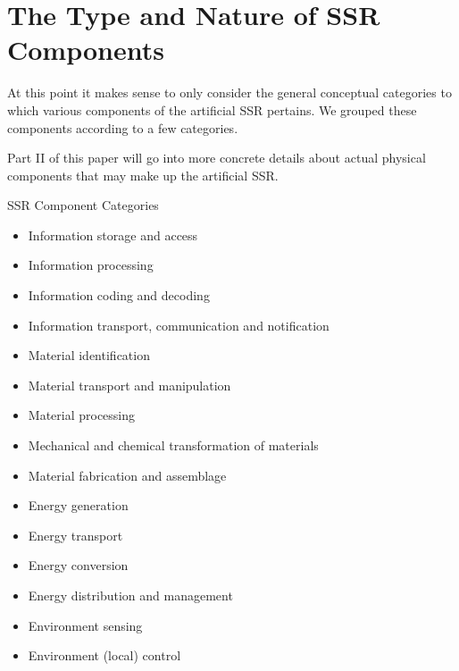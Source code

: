 \section{The Type and Nature of SSR Components}

At this point it makes sense to only consider the general conceptual
categories to which various components of the artificial SSR pertains.
We grouped these components according to a few categories.

Part II of this paper will go into more concrete details about actual
physical components that may make up the artificial SSR.

SSR Component Categories %

\begin{itemize}
\item Information storage and access
\item Information processing
\item Information coding and decoding
\item Information transport, communication and notification
\end{itemize}

\bigskip

\begin{itemize}
\item Material identification
\item Material transport and manipulation
\item Material processing
\item Mechanical and chemical transformation of materials
\item Material fabrication and assemblage
\end{itemize}

\bigskip

\begin{itemize}
\item Energy generation
\item Energy transport
\item Energy conversion
\item Energy distribution and management
\end{itemize}

\bigskip

\begin{itemize}
\item Environment sensing
\item Environment (local) control
\end{itemize}


